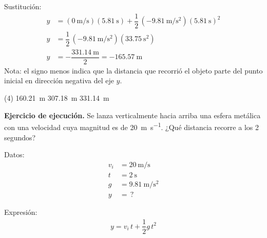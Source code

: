 \documentclass[12pt, letter]{exam}
\begin{document}
\begin{questions}
    Sustitución:
    \begin{align*}
    y &= \left( \displaystyle \SI[per-mode=fraction]{0}{\meter\per\second} \right) (\SI{5.81}{\second}) + \dfrac{1}{2} \, \left( \displaystyle -\SI[per-mode=fraction]{9.81}{\meter\per\square\second} \right) \left(\SI{5.81}{\second} \right)^{2} \\[0.5em]
    y &= \dfrac{1}{2} \, \left( \displaystyle -\SI[per-mode=fraction]{9.81}{\meter\per\square\second} \right) \left(\SI{33.75}{\square\second} \right) \\[0.5em]
    y &= - \dfrac{\SI{331.14}{\meter}}{2} = - \SI{165.57}{\meter}
    \end{align*}
    Nota: el signo menos indica que la distancia que recorrió el objeto parte del punto inicial en dirección negativa del eje $y$.
    \begin{tasks}(4)
        \task \SI{160.21}{\meter}
        \task {}
        \task \SI{307.18}{\meter}
        \task \SI{331.14}{\meter}
    \end{tasks}
    \setcounter{question}{12} \question \label{Ejercicio_06} \textbf{Ejercicio de ejecución. } Se lanza verticalmente hacia arriba una esfera metálica con una velocidad cuya magnitud es de \SI{20}{\meter\per\second}. ¿Qué distancia recorre a los \num{2} segundos?

    \begin{minipage}[t]{0.35\linewidth}
    Datos: 
    \begin{align*}
    v_{i} &= \SI{20}{\meter\per\second} \\
    t &= \SI{2}{\second} \\
    g &= \SI{9.81}{\meter\per\square\second} \\
    y &= \, ?
    \end{align*}
    \end{minipage}
    \hspace{1cm}
    \begin{minipage}[t]{0.4\linewidth}
    Expresión:
    \begin{align*}
    y = v_{i} \, t + \dfrac{1}{2} g \, t^{2}
    \end{align*}
    \end{minipage}


\end{questions}
\end{document}
